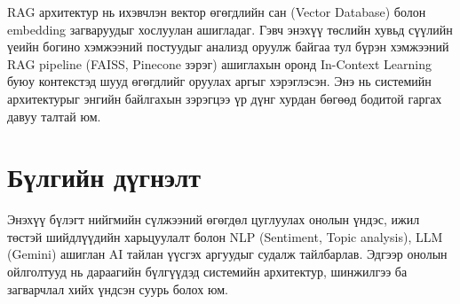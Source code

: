 RAG архитектур нь ихэвчлэн вектор өгөгдлийн сан (Vector Database) болон embedding загваруудыг хослуулан ашигладаг. Гэвч энэхүү төслийн хувьд сүүлийн үеийн богино хэмжээний постуудыг анализд оруулж байгаа тул бүрэн хэмжээний RAG pipeline (FAISS, Pinecone зэрэг) ашиглахын оронд In-Context Learning буюу контекстэд шууд өгөгдлийг оруулах аргыг хэрэглэсэн. Энэ нь системийн архитектурыг энгийн байлгахын зэрэгцээ үр дүнг хурдан бөгөөд бодитой гаргах давуу талтай юм.

\section{Бүлгийн дүгнэлт}
Энэхүү бүлэгт нийгмийн сүлжээний өгөгдөл цуглуулах онолын үндэс, ижил төстэй шийдлүүдийн харьцуулалт болон NLP (Sentiment, Topic analysis), LLM (Gemini) ашиглан AI тайлан үүсгэх аргуудыг судалж тайлбарлав. Эдгээр онолын ойлголтууд нь дараагийн бүлгүүдэд системийн архитектур, шинжилгээ ба загварчлал хийх үндсэн суурь болох юм.
